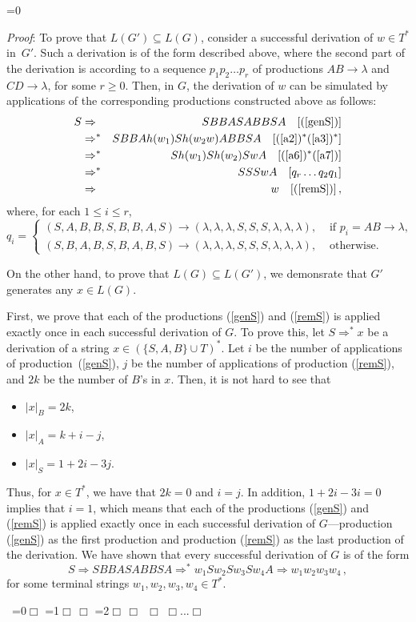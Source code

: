 \documentclass[copyright]{eptcs}
\makeatletter
\newcounter{d@proof}\let\thed@proof\relax\setcounter{d@proof}{0}
\newcommand*{\qed}{$\Box$}
\newenvironment{proof}{\ifnum \value{d@proof}=0{\setcounter{claim}{0}}\else\fi
  \stepcounter{d@proof}\par\noindent
  {\rmfamily\itshape\mdseries Proof\/}:\hspace{\labelsep}\ignorespaces}{\addtocounter{d@proof}{-1}\mbox{}\nolinebreak\hfill~\ifnum \value{d@proof}=0{\qed}\else
    \ifnum \value{d@proof}=1{\qed\nolinebreak\,\nolinebreak\qed}\else
      \ifnum \value{d@proof}=2{\qed\nolinebreak\,\nolinebreak\qed
          \nolinebreak\,\nolinebreak\qed}\else
        {\qed\nolinebreak...\nolinebreak\qed}\fi\fi\fi
  \medbreak
}
\newcommand{\Ra}{\Rightarrow}
\newcommand{\eps}{\lambda}
\makeatother
\begin{document}
\begin{proof}
    To prove that $L(G')\subseteq L(G)$, consider a successful derivation of $w\in T^*$ 
    in~$G'$. Such a derivation is of the form described above, where the second part of the derivation is according to a sequence $p_1p_2\dots p_r$ of productions $AB\to\eps$ and $CD\to\eps$, for some $r\ge 0$. Then, in $G$, the derivation of $w$ can be simulated by applications of the corresponding productions constructed above as follows:
    \begin{eqnarray*}
      S & \Ra   & SBBASABBSA \quad [\textrm{(\ref{genS})}]\\
        & \Ra^* & SBBAh(w_1)Sh(w_2w)ABBSA \quad [\textrm{(\ref{a2})$^*$(\ref{a3})$^*$}]\\
        & \Ra^* & Sh(w_1)Sh(w_2)SwA \quad [\textrm{(\ref{a6})$^*$(\ref{a7})}]\\
        & \Ra^* & SSSwA \quad [q_r\dots q_2q_1]\\
        & \Ra   & w \quad [\textrm{(\ref{remS})}]\,,
    \end{eqnarray*}
    where, for each $1\le i\le r$,
    $$q_i=\begin{cases}
    (S,A,B,B,S,B,B,A,S)\to (\eps,\eps,\eps,S,S,S,\eps,\eps,\eps), & \text{ if $p_i=AB\to\eps$}, \\
    (S,B,A,B,S,B,A,B,S)\to (\eps,\eps,\eps,S,S,S,\eps,\eps,\eps), & \text{ otherwise}.
    \end{cases}$$


    On the other hand, to prove that $L(G)\subseteq L(G')$, we demonsrate that $G'$ generates any $x\in L(G)$.

    First, we prove that each of the productions (\ref{genS}) and (\ref{remS}) is applied exactly once in each successful derivation of $G$. To prove this, let $S\Ra^* x$ be a derivation of a string $x\in(\{S,A,B\}\cup T)^*$. Let $i$ be the number of applications of production~(\ref{genS}), $j$ be the number of applications of production (\ref{remS}), and $2k$ be the number of $B$'s in $x$. Then, it is not hard to see that
    \begin{itemize}
      \item $|x|_B = 2k$,
      \item $|x|_A = k + i - j$,
      \item $|x|_S = 1 + 2i - 3j$.
    \end{itemize}
    Thus, for $x\in T^*$, we have that $2k=0$ and $i=j$. In addition, $1+2i-3i=0$ implies that $i=1$, which means that each of the productions (\ref{genS}) and (\ref{remS}) is applied exactly once in each successful derivation of $G$---production (\ref{genS}) as the first production and production (\ref{remS}) as the last production of the derivation. We have shown that every successful derivation of $G$ is of the form \[S\Ra SBBASABBSA \Ra^* w_1Sw_2Sw_3Sw_4A \Ra w_1w_2w_3w_4\,,\] for some terminal strings $w_1,w_2,w_3,w_4\in T^*$.


\end{proof}
\end{document}
